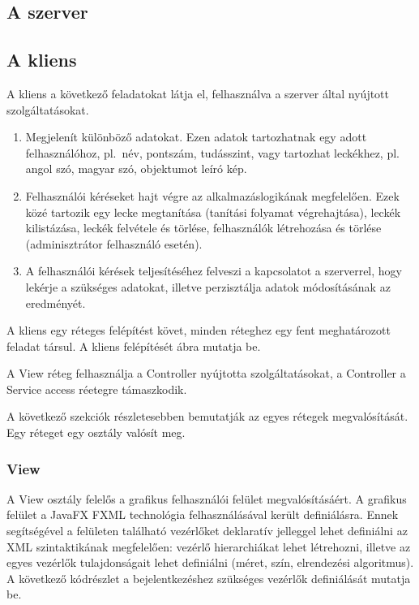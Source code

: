 \documentclass[a4paper]{article}
\begin{document}
    \subsection{A szerver}
    
    \subsection{A kliens}
    \label{sec:kliens}
    A kliens a következő feladatokat látja el, felhasználva a szerver által nyújtott szolgáltatásokat.
    \begin{enumerate}
    	\item Megjelenít különböző adatokat. Ezen adatok tartozhatnak egy adott felhasználóhoz, pl.~név, pontszám, tudásszint, vagy tartozhat leckékhez, pl. angol szó, magyar szó, objektumot leíró kép.
    	\item Felhasználói kéréseket hajt végre az alkalmazáslogikának megfelelően. Ezek közé tartozik egy lecke megtanítása (tanítási folyamat végrehajtása), leckék kilistázása, leckék felvétele és törlése, felhasználók létrehozása és törlése (adminisztrátor felhasználó esetén).
    	\item A felhasználói kérések teljesítéséhez felveszi a kapcsolatot a szerverrel, hogy lekérje a szükséges adatokat, illetve perzisztálja adatok módosításának az eredményét.
    \end{enumerate}

	A kliens egy réteges felépítést követ, minden réteghez egy fent meghatározott feladat társul. A kliens felépítését \aref{} ábra mutatja be.
	
	A View réteg felhasználja a Controller nyújtotta szolgáltatásokat, a Controller a Service access réetegre támaszkodik.
    
     A következő szekciók részletesebben bemutatják az egyes rétegek megvalósítását. Egy réteget egy osztály valósít meg.
     
     \subsubsection{View}
     A View osztály felelős a grafikus felhasználói felület megvalósításáért. A grafikus felület a JavaFX FXML technológia felhasználásával került definiálásra. Ennek segítségével a felületen található vezérlőket deklaratív jelleggel lehet definiálni az XML szintaktikának megfelelően: vezérlő hierarchiákat lehet létrehozni, illetve az egyes vezérlők tulajdonságait lehet definiálni (méret, szín, elrendezési algoritmus). A következő kódrészlet a bejelentkezéshez szükséges vezérlők definiálását mutatja be.
     
\end{document}
